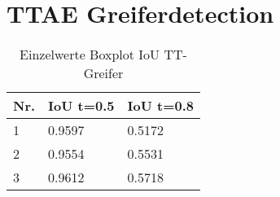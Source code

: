 \chapter{TTAE Greiferdetection}
\label{appendix:TTAEGreifer }

	
	
	\begin{table}[ht]
		\centering
		\begin{tabularx}{\textwidth}{lll}
			\textbf{Nr.}  & \textbf{IoU t=0.5} & \textbf{IoU t=0.8}  	 \\ \hline 
			1 & 0.9597 & 0.5172  \\
			2 & 0.9554 & 0.5531 \\
			3 & 0.9612 & 0.5718 \\
		\end{tabularx}
		\caption{Einzelwerte Boxplot IoU TT-Greifer}
		\label{table:EinzelwerteBoxplotIoUTTGreifer}
	\end{table}